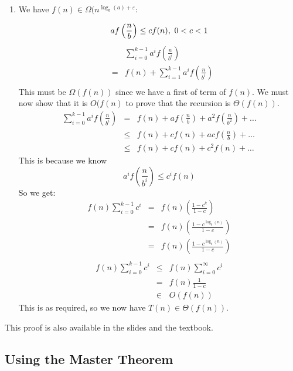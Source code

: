 \documentclass[12pt]{article}
\begin{document}
\begin{enumerate}
    \item We have $f(n) \in \Omega(n^{\log_b(a)+\varepsilon}$:

        \[
        af\left( \frac{n}{b} \right)\leq cf(n),\ 0 < c < 1\\
        \]
        \begin{eqnarray*}
            &&\sum_{i=0}^{k-1}a^if\left( \frac{n}{b^i} \right)\\
            &=&f(n)+\sum_{i=1}^{k-1}a^if\left( \frac{n}{b^i} \right)\\ 
        \end{eqnarray*}
        This must be $\Omega(f(n))$ since we have a first of term of $f(n)$. We
        must now show that it is $O(f(n)$ to prove that the recursion is
        $\Theta(f(n))$.
        \begin{eqnarray*}
             \sum_{i=0}^{k-1}a^if\left( \frac{n}{b^i} \right) &=&  f(n) +
            af\left( \frac{n}{b} \right) + a^2f\left( \frac{n}{b^2} \right) +
            \dots\\
            &\leq& f(n) + cf(n) + acf\left( \frac{n}{b} \right) + \dots\\
            &\leq& f(n) + cf(n) + c^2f(n) + \dots
        \end{eqnarray*}
        This is because we know
        \[
        a^if\left( \frac{n}{b^i} \right) \leq c^if(n)
        \]
        So we get:
        \begin{eqnarray*}
            f(n)\sum_{i=0}^{k-1}c^i &=& f(n) \left( \frac{1-c^k}{1-c} \right)\\
            &=& f(n) \left( \frac{1-c^{\log_b(n)}}{1-c} \right)\\
            &=& f(n) \left( \frac{1-c^{\log_b(n)}}{1-c} \right)\\
        \end{eqnarray*}
        \begin{eqnarray*}
            f(n)\sum_{i=0}^{k-1}c^i &\leq& f(n)\sum_{i=0}^{\infty} c^i\\
            &=& f(n)\frac{1}{1-c}\\
            &\in&O(f(n))
        \end{eqnarray*}
        This is as required, so we now have $T(n) \in \Theta(f(n))$.
\end{enumerate}

This proof is also available in the slides and the textbook. 

\subsection{Using the Master Theorem}
\end{document}
